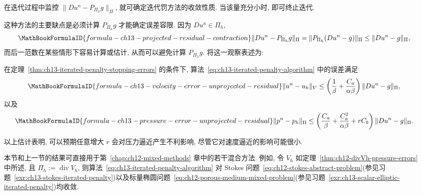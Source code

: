 在迭代过程中监控 $\|Du^n-P_{\Pi_h}g\|_\Pi$, 就可确定迭代罚方法的收敛性质. 当该量充分小时, 即可终止迭代.

这种方法的主要缺点是必须计算 $P_{\Pi_h}g$ 才能确定误差容限. 因为 $Du^n\in\Pi_h$,
\[
\MathBookFormulaID{formula-ch13-projected-residual-contraction}
\|Du^n-P_{\Pi_h}g\|_\Pi
=\|P_{\Pi_h}(Du^n-g)\|_\Pi
\leq\|Du^n-g\|_\Pi,
\]
而后一范数在某些情形下容易计算或估计, 从而可以避免计算 $P_{\Pi_h}g$. 将这一观察表述为:

\begin{Corollary}
\label{cor:ch13-iterated-penalty-unprojected-residual-errors}
在定理~\ref{thm:ch13-iterated-penalty-stopping-errors} 的条件下, 算法~\eqref{eq:ch13-iterated-penalty-algorithm} 中的误差满足
\begin{equation}
\MathBookFormulaID{formula-ch13-velocity-error-unprojected-residual}
\label{eq:ch13-velocity-error-unprojected-residual}
\|u^n-u_h\|_V
\leq\left(\frac1\beta+\frac{C_a}{\alpha\beta}\right)
\|Du^n-g\|_\Pi,
\end{equation}
以及
\begin{equation}
\MathBookFormulaID{formula-ch13-pressure-error-unprojected-residual}
\label{eq:ch13-pressure-error-unprojected-residual}
\|p^n-p_h\|_\Pi
\leq\left(\frac{C_a}{\beta}+\frac{C_a^2}{\alpha\beta}+rC_b\right)
\|Du^n-g\|_\Pi.
\end{equation}
\end{Corollary}

\begin{Remark}
\label{rem:ch13-large-penalty-pressure-effect}
以上估计表明, 可以预期任意增大 $r$ 会对压力逼近产生不利影响, 尽管它对速度逼近的影响可能很小.
\end{Remark}

本节和上一节的结果可直接用于第~\ref{chap:ch12-mixed-methods} 章中的若干混合方法. 例如, 令 $V_h$ 如定理~\ref{thm:ch12-divVh-pressure-errors} 中所述, 且 $\Pi_h:=\operatorname{div}V_h$, 则算法~\eqref{eq:ch13-iterated-penalty-algorithm} 对 Stokes 问题~\eqref{eq:ch12-stokes-abstract-problem}(参见习题~\ref{exr:ch13-stokes-iterated-penalty})以及标量椭圆问题~\eqref{eq:ch12-porous-medium-mixed-problem}(参见习题~\ref{exr:ch13-scalar-elliptic-iterated-penalty})均收敛.
